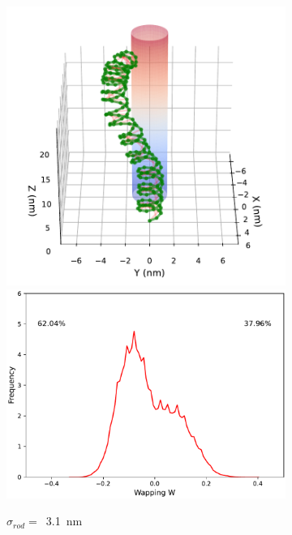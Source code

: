 \documentclass[a4paper,10pt]{article}
\begin{document}
\begin{figure}[tb]
\begin{subfigure}{.3\textwidth}
\includegraphics[width=\textwidth]{r2_B_2000000.pdf}
\includegraphics[width=\textwidth]{r2_B_wr_pr.pdf}
\caption{$\sigma_{rod}=$~\SI{3.1}{\nm}}
\label{fig:r2_b}
\end{subfigure}
\begin{subfigure}{.3\textwidth}

\end{subfigure}
\end{figure}
\end{document}
